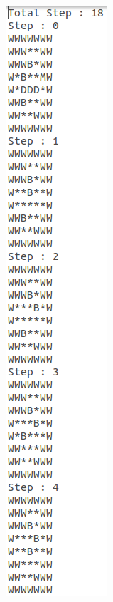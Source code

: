 \documentclass[10pt, letter]{article}
\begin{document}
\begin{figure} [h!]
\centering
\begin{subfigure}{.3\textwidth}
  \centering
  \includegraphics[scale = 0.35]{images/sokobanC-ans1}
\end{subfigure}%
\begin{subfigure}{.3\textwidth}
  \centering

\end{subfigure}
\end{figure}
\end{document}
